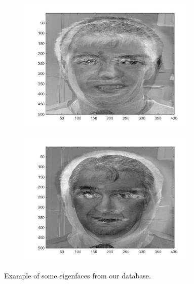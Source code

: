 \begin{figure}[H]
\begin{subfigure}{.24\textwidth}
  \caption{}
\end{subfigure}%
\begin{subfigure}{.24\textwidth}
  \centering
  \includegraphics[width=0.95\textwidth]{img/fr/eigenface3.jpg}
  \caption{}
\end{subfigure}%
\begin{subfigure}{.24\textwidth}
  \centering
  \includegraphics[width=0.95\textwidth]{img/fr/eigenface4.jpg}
  \caption{}
\end{subfigure}%

\caption{Example of some eigenfaces from our database.}
\label{fig:eigenface}
\end{figure}

